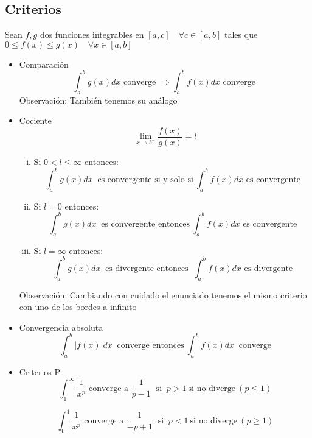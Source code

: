 \documentclass{article}
\theoremstyle{break}
\begin{document}
	\subsection{Criterios}
	Sean $f,g$ dos funciones integrables en $[a,c] \quad \forall c\in [a,b]$ tales que $0 \leq f(x) \leq g(x) \quad \forall x\in [a,b]$
	\begin{itemize}
		\item  Comparación
			\[\int_{a}^{b} g(x)dx \text{ converge }\Rightarrow \int_{a}^{b} f(x)dx \text{ converge }\]
			Observación: También tenemos su análogo
		\item Cociente
			\[\lim_{x\rightarrow b^-} \frac{f(x)}{g(x)}= l \] 
			\begin{enumerate}[(i)]
				\item Si $0< l \leq \infty $ entonces:
					\[\int_{a}^{b} g(x)dx\ \text{ es convergente si y solo si}\ \int_{a}^{b}f(x)dx \text{ es convergente}\] 
				\item Si $l=0$ entonces: 
					\[\int_{a}^{b}g(x)dx\ \text{ es convergente entonces}\ \int_{a}^{b}f(x)dx\text{ es convergente}\]
				\item Si $l=\infty$ entonces:
					\[\int_{a}^{b}g(x)dx\ \text{ es divergente entonces }\ \int_{a}^{b}f(x)dx \text{ es divergente} \]
			\end{enumerate}

			Observación: Cambiando con cuidado el enunciado tenemos el mismo criterio con uno de los bordes a infinito
		\item Convergencia absoluta
			\[\int_{a}^{b}|f(x)|dx\ \text{ converge entonces}\ \int_{a}^{b}f(x)dx\ \text{ converge}\]
		\item Criterios P
			\[\int_{1}^{\infty}\frac{1}{x^p} \text{ converge a } \frac{1}{p-1}\ \text{ si }\ p>1\ \text{si no diverge}\ (p\leq1)\]	

			\[\int_{0}^{1}\frac{1}{x^p} \text{ converge a } \frac{1}{-p+1}\ \text{ si }\ p<1\ \text{si no diverge}\ (p\geq 1)\]	
	\end{itemize}
			
\end{document}
